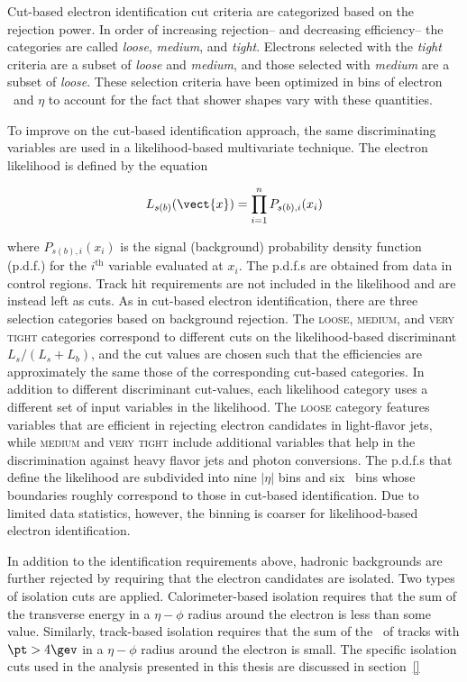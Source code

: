 Cut-based electron identification cut criteria are categorized based
on the rejection power. In order of increasing rejection-- and decreasing
efficiency-- the categories are called {\it loose}, {\it medium}, and
{\it tight}. Electrons selected with the {\it tight} criteria are a
subset of {\it loose} and {\it medium}, and those selected with {\it
  medium} are a subset of {\it loose}. These selection criteria have
been optimized in bins of electron \et~and $\eta$ to account for the
fact that shower shapes vary with these quantities. 

To improve on the cut-based identification approach, the same
discriminating variables are used in a likelihood-based multivariate
technique. The electron likelihood is defined by the equation

\begin{equation}
L_{s(b)}(\vect{x}) = \prod_{i=1}^n P_{s(b),i}(x_i)
\end{equation}

\noindent
where $P_{s(b),i}(x_i)$ is the signal (background) probability
density function (p.d.f.) for the $i^{\textrm{th}}$ variable evaluated at
$x_i$. The p.d.f.s are obtained from data in control regions. Track
hit requirements are not included in the likelihood and are instead
left as cuts. As in cut-based electron identification, there are three
selection categories based on background rejection. The
\textsc{loose}, \textsc{medium}, and \textsc{very tight} categories
correspond to different cuts on the likelihood-based discriminant
$L_s/(L_s+L_b)$, and the cut values are chosen such that the
efficiencies are approximately the same those of the corresponding
cut-based categories. In addition to different discriminant
cut-values, each likelihood category uses a different set of input
variables in the likelihood. The \textsc{loose} category features
variables that are efficient in rejecting electron candidates in
light-flavor jets, while \textsc{medium} and \textsc{very tight}
include additional variables that help in the discrimination against
heavy flavor jets and photon conversions. The p.d.f.s that define the
likelihood are subdivided into nine $|\eta|$ bins and six \et~bins
whose boundaries roughly correspond to those in cut-based
identification. Due to limited data statistics, however, the binning
is coarser for likelihood-based electron identification.

In addition to the identification requirements above, hadronic
backgrounds are further rejected by requiring that the electron
candidates are isolated. Two types of isolation cuts are
applied. Calorimeter-based isolation requires that the sum of the
transverse energy in a $\eta-\phi$ radius around the electron is less
than some value. Similarly, track-based isolation requires that the
sum of the \pt~of tracks with $\pt>4 \gev$ in a $\eta-\phi$ radius
around the electron is small. The specific isolation cuts used in the analysis
presented in this thesis are discussed in section~\ref{}

